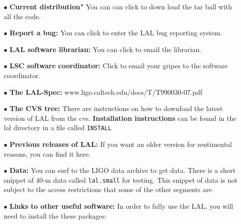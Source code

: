 \documentclass[oneside]{book}
\begin{document}
\begin{itemize}
   \vspace*{-0.1in}
    \item[$\bullet$ ]  {\bf Current distribution"} You can can click
                       to down load the tar ball with all the code.
    \vspace*{-0.051in}
    \item[$\bullet$ ] {\bf Report a bug:}  You can click to enter
                      the LAL bug reporting system.
    \vspace*{-0.051in}
    \item[$\bullet$ ] {\bf LAL software librarian:}  You can click to
                      email the librarian.
    \vspace*{-0.051in}
    \item[$\bullet$ ] {\bf LSC software coordinator:} Click
                      to email your gripes to the software coordinator.
    \vspace*{-0.051in}
    \item[$\bullet$ ] {\bf The LAL-Spec:} 
                      www.ligo.caltech.edu/docs/T/T990030-07.pdf
    \vspace*{-0.051in}
    \item[$\bullet$ ] {\bf The CVS tree:}  There are instructions
                      on how to download the latest version of
                      LAL from the cvs. {\bf Installation
                      instructions} can be found in the lal
                      directory in a file called {\tt INSTALL}
    \vspace*{-0.051in}
    \item[$\bullet$]  {\bf Previous releases of LAL:} If you want an older 
                      version for sentimental reasons, you can find it here.
    \vspace*{-0.051in}
    \item[$\bullet$ ] {\bf Data:}  You can surf to the LIGO data archive to get
                      data.  There is a short snippet of 40-m data called 
                      {\tt lal.small} for testing.  This snippet of data 
                      is not subject to the access restrictions that some 
                      of the other segments are.
    \vspace*{-0.051in}
    \item[$\bullet$ ] {\bf Links to other useful software:} In order to
                      fully use the LAL, you will need to install the
                      these packages:
    \begin{itemize} 

\end{itemize}
\end{itemize}
\end{document}
